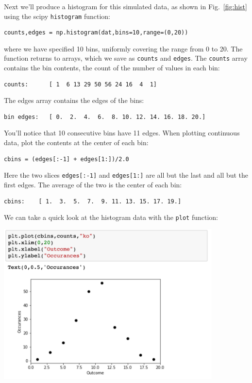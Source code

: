 Next we'll produce a histogram for this simulated data, as shown in
Fig.~\ref{fig:hist} using the scipy {\tt histogram} function:
\begin{verbatim}
counts,edges = np.histogram(dat,bins=10,range=(0,20))
\end{verbatim}
where we have specified 10 bins, uniformly covering the range from 0
to 20.  The function returns to arrays, which we save as {\tt counts}
and {\tt edges}.  The {\tt counts} array contains the bin contents,
the count of the number of values in each bin:
\begin{verbatim}
counts:      [ 1  6 13 29 50 56 24 16  4  1]
\end{verbatim}
The edges array contains the edges of the bins:
\begin{verbatim}
bin edges:   [ 0.  2.  4.  6.  8. 10. 12. 14. 16. 18. 20.]
\end{verbatim}
You'll notice that 10 consecutive bins have 11 edges.  When plotting continuous data, plot the contents at the center of each bin:
\begin{verbatim}
cbins = (edges[:-1] + edges[1:])/2.0
\end{verbatim}
Here the two slices {\tt edges[:-1]} and {\tt edges[1:]} are all but the last and all but the first edges.  The average of the two is the center of each bin:
\begin{verbatim}
cbins:    [ 1.  3.  5.  7.  9. 11. 13. 15. 17. 19.]
\end{verbatim}

We can take a quick look at the histogram data with the {\tt plot} function:
\begin{center}
\includegraphics[width=0.85\textwidth]{figs/histograms/plot.png}\\ 
\end{center}

